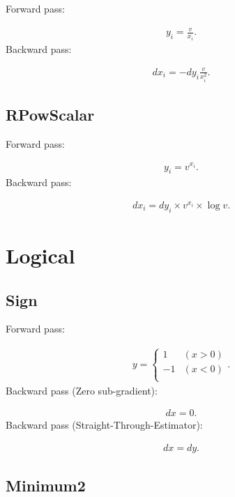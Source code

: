 \documentclass{article}
\begin{document}
Forward pass:

\begin{eqnarray}
  y_i = \frac{v}{x_i}.
\end{eqnarray}
%
Backward pass:

\begin{eqnarray}
  dx_i = - dy_i \frac{v}{x_i^2}.
\end{eqnarray}


\subsection{RPowScalar}

Forward pass:

\begin{eqnarray}
  y_i = v ^ {x_i}.
\end{eqnarray}
%
Backward pass:

\begin{eqnarray}
  dx_i = dy_i \times v ^ {x_i} \times \log{v}.
\end{eqnarray}

\section{Logical}
\label{sec:Logical}

\subsection{Sign}

Forward pass:

\begin{eqnarray}
  y = \begin{cases}
    1  & (x > 0) \\
    -1 & (x < 0) \\
  \end{cases}.
\end{eqnarray}
%
Backward pass (Zero sub-gradient):

\begin{eqnarray}
  dx = 0.
\end{eqnarray}
%
Backward pass (Straight-Through-Estimator):

\begin{eqnarray}
  dx = dy. 
\end{eqnarray}

\subsection{Minimum2}
\end{document}
